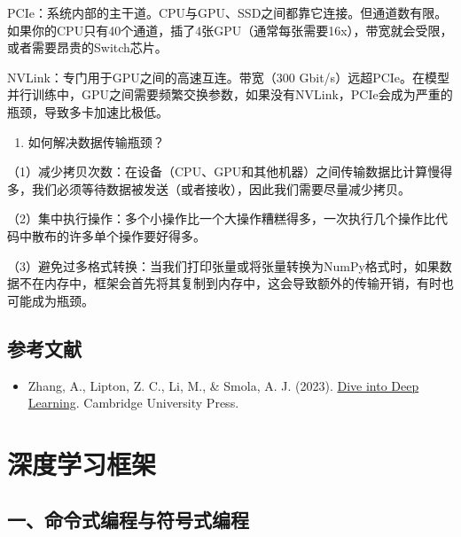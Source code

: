 PCIe：系统内部的主干道。CPU与GPU、SSD之间都靠它连接。但通道数有限。如果你的CPU只有40个通道，插了4张GPU（通常每张需要16x），带宽就会受限，或者需要昂贵的Switch芯片。

NVLink：专门用于GPU之间的高速互连。带宽（300 Gbit/s）远超PCIe。在模型并行训练中，GPU之间需要频繁交换参数，如果没有NVLink，PCIe会成为严重的瓶颈，导致多卡加速比极低。

\begin{enumerate}
\def\labelenumi{\arabic{enumi}.}
\setcounter{enumi}{1}
\tightlist
\item
  如何解决数据传输瓶颈？
\end{enumerate}

（1）减少拷贝次数：在设备（CPU、GPU和其他机器）之间传输数据比计算慢得多，我们必须等待数据被发送（或者接收），因此我们需要尽量减少拷贝。

（2）集中执行操作：多个小操作比一个大操作糟糕得多，一次执行几个操作比代码中散布的许多单个操作要好得多。

（3）避免过多格式转换：当我们打印张量或将张量转换为NumPy格式时，如果数据不在内存中，框架会首先将其复制到内存中，这会导致额外的传输开销，有时也可能成为瓶颈。

\hypertarget{ux53c2ux8003ux6587ux732e-34}{%
\subsection{参考文献}\label{ux53c2ux8003ux6587ux732e-34}}

\vspace{0.25em}
\begin{itemize}
\tightlist
\item
  Zhang, A., Lipton, Z. C., Li, M., \& Smola, A. J. (2023). \href{https://D2L.ai}{Dive into Deep Learning}. Cambridge University Press.
\end{itemize}

\clearpage

\hypertarget{ux6df1ux5ea6ux5b66ux4e60ux6846ux67b6}{%
\section{深度学习框架}\label{ux6df1ux5ea6ux5b66ux4e60ux6846ux67b6}}

\hypertarget{ux4e00ux547dux4ee4ux5f0fux7f16ux7a0bux4e0eux7b26ux53f7ux5f0fux7f16ux7a0b}{%
\subsection{一、命令式编程与符号式编程}\label{ux4e00ux547dux4ee4ux5f0fux7f16ux7a0bux4e0eux7b26ux53f7ux5f0fux7f16ux7a0b}}

